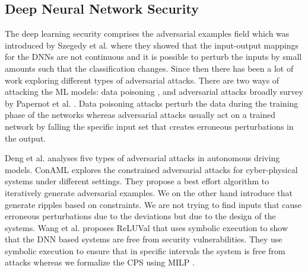 \subsection{Deep Neural Network Security}

The deep learning security comprises the adversarial examples field which was introduced by Szegedy et al. \cite{Szegedy2013IntriguingPO} where they showed that the input-output mappings for the DNNs are not continuous and it is possible to perturb the inputs by small amounts such that the classification changes. Since then there has been a lot of work exploring different types of adversarial attacks. There are two ways of attacking the \ac{ML} models: data poisoning \cite{DBLP:journals/corr/abs-1903-01666}, and adversarial attacks broadly survey by Papernot et al. \cite{DBLP:journals/corr/PapernotMSW16}. Data poisoning attacks perturb the data during the training phase of the networks whereas adversarial attacks usually act on a trained network by falling the specific input set that creates erroneous perturbations in the output. 



 Deng et al. \cite{deng2020analysis} analyses five types of adversarial attacks in autonomous driving models.  ConAML \cite{li2020conaml} explores the constrained adversarial attacks for cyber-physical systems under different settings. They propose a best effort algorithm to iteratively generate adversarial examples. We on the other hand introduce \attack  that generate ripples based on constraints. We are not trying to find inputs that cause erroneous perturbations due to the deviations but due to the design of the systems. 
  Wang et al. \cite{217595} proposes ReLUVal that uses symbolic execution to show that the DNN based systems are free from security vulnerabilities. They use symbolic execution to ensure that in specific intervals the system is free from attacks whereas we formalize the \ac{CPS} using \ac{MILP} . 


